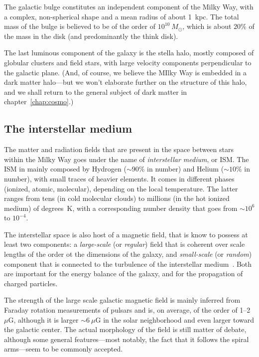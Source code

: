 The galactic bulge constitutes an independent component of the Milky Way, with a
complex, non-spherical shape and a mean radius of about 1~kpc. The total mass of the
bulge is believed to be of the order of $10^{10}~M_\odot$, which is about $20\%$ of
the mass in the disk (and predominantly the think disk).

The last luminous component of the galaxy is the stella halo, mostly composed of
globular clusters and field stars, with large velocity components perpendicular to the
galactic plane.
(And, of course, we believe the MIlky Way is embedded in a dark matter halo---but we
won't elaborate further on the structure of this halo, and we shall return to the
general subject of dark matter in chapter~\ref{chap:cosmo}.)


\subsection{The interstellar medium}

The matter and radiation fields that are present in the space between stars within
the Milky Way goes under the name of \emph{interstellar medium}, or
ISM.
The ISM in mainly composed by Hydrogen ($\sim 90\%$ in number) and Helium
($\sim 10\%$ in number), with small traces of heavier elements. It comes in different phases (ionized, atomic, molecular), depending
on the local temperature. The latter ranges from tens (in cold molecular clouds)
to millions (in the hot ionized medium) of degrees~K, with a corresponding number
density that goes from $\sim 10^6$ to $10^{-4}$.

The interstellar space is also host of a magnetic field, that is know to possess
at least two components: a \emph{large-scale} (or \emph{regular}) field that is
coherent over scale lengths of the order ot the dimensions of the galaxy, and
\emph{small-scale} (or \emph{random}) component that is connected to the turbulence
of the interstellar medium~\cite{Haverkorn2015}. Both are important for the energy
balance of the galaxy, and for the propagation of charged particles.

The strength of the large scale galactic magnetic field is mainly inferred from
Faraday rotation measurements of pulsars and is, on average, of the order of 1--2~$\mu$G,
although it is larger $\sim 6~\mu$G in the solar neighborhood and even larger toward
the galactic center. The actual morphology of the field is still matter of debate,
although some general features---most notably, the fact that it follows the spiral
arms---seem to be commonly accepted.

